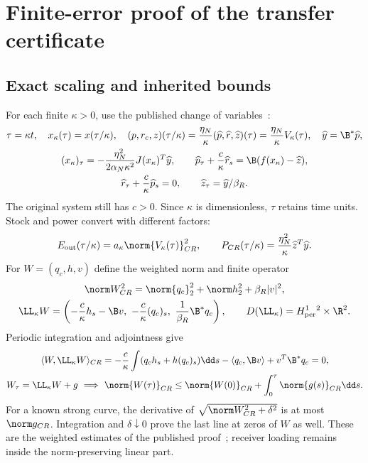\section{Finite-error proof of the transfer certificate}\label{sec:proof}
\subsection{Exact scaling and inherited bounds}
For each finite $\kappa>0$, use the published change of variables~\cite[Section 4.1]{p2}:
\begin{equation}\label{eq:scaling}%
\begin{gathered}
\tau=\kappa t,\quad x_\kappa(\tau)=x(\tau/\kappa),\quad
(p,r_c,z)(\tau/\kappa)=\frac{\eta_N}{\kappa}
(\widehat p,\widehat r,\widehat z)(\tau)=\frac{\eta_N}{\kappa}V_\kappa(\tau),
\quad \widehat y=\B^*\widehat p,\\
(x_\kappa)_\tau=-\frac{\eta_N^2}{2\alpha_N\kappa^2}J(x_\kappa)^T\widehat y,\qquad
\widehat p_\tau+\frac c\kappa\widehat r_s=\B(f(x_\kappa)-\widehat z),\\
\widehat r_\tau+\frac c\kappa\widehat p_s=0,\qquad
\widehat z_\tau=\widehat y/\beta_R .
\end{gathered}
\end{equation}
The original system still has $c>0$. Since $\kappa$ is dimensionless, $\tau$ retains time units. Stock and power convert with different factors:
\begin{equation}\label{eq:conversion}%
E_{\rm out}(\tau/\kappa)=a_\kappa\norm{V_\kappa(\tau)}_{CR}^2,\qquad
P_{CR}(\tau/\kappa)=\frac{\eta_N^2}{\kappa}\widehat z^T\widehat y .
\end{equation}
For $W=(q_c,h,v)$ define the weighted norm and finite operator
\begin{equation}\label{eq:operator}%
\begin{gathered}
\norm W_{CR}^2=\norm{q_c}_2^2+\norm h_2^2+\beta_R|v|^2,\\
\LL_\kappa W=
\left(-\frac c\kappa h_s-\B v,\ -\frac c\kappa(q_c)_s,\
\frac1{\beta_R}\B^*q_c\right),\qquad
D(\LL_\kappa)=H^1_{\rm per}{}^2\times\R^2 .
\end{gathered}
\end{equation}
Periodic integration and adjointness give
\begin{equation}\label{eq:forced}%
\begin{gathered}
\langle W,\LL_\kappa W\rangle_{CR}
=-\frac c\kappa\int(q_ch_s+h(q_c)_s)\dd s
-\langle q_c,\B v\rangle+v^T\B^*q_c=0,\\
W_\tau=\LL_\kappa W+g
\ \Longrightarrow\
\norm{W(\tau)}_{CR}\le\norm{W(0)}_{CR}+\int_0^\tau\norm{g(s)}_{CR}\dd s .
\end{gathered}
\end{equation}
For a known strong curve, the derivative of
$\sqrt{\norm W_{CR}^2+\delta^2}$ is at most $\norm g_{CR}$. Integration and $\delta\downarrow0$ prove the last line at zeros of $W$ as well. These are the weighted estimates of the published proof~\cite[Section 4.2]{p2}; receiver loading remains inside the norm-preserving linear part.

